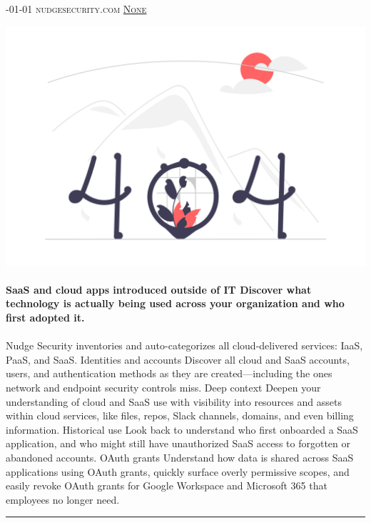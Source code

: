 \documentclass[10pt,a4paper]{article}
\begin{document}
\begin{multicols*}{2}

\noindent\begin{minipage}{\linewidth}
\subsection{}
\textsc{\footnotesize
{\scriptsize\faCalendar}-01-01 
{\scriptsize\faGlobe}\space 
nudgesecurity.com 
{\scriptsize\faComments}\space 
\href{}{None} 
}
\par\medskip\noindent
\href{https://www.nudgesecurity.com/free-shadow-it-inventory?utm\_medium=sponsored\&utm\_source=hacker\_nl\&utm\_content=newsletter\&utm\_campaign=shadow\_it\&utm\_term=230825}{
    \includegraphics[width=0.99\linewidth]{notfound.png}
}
\end{minipage}
\paragraph{}
\textbf{SaaS and cloud apps introduced outside of IT
Discover what technology is actually being used across your organization and who first adopted it.}
\paragraph{}
 Nudge Security inventories and auto-categorizes all cloud-delivered services: IaaS, PaaS, and SaaS.
Identities and accounts
Discover all cloud and SaaS accounts, users, and authentication methods as they are created—including the ones network and endpoint security controls miss.
Deep context
Deepen your understanding of cloud and SaaS use with visibility into resources and assets within cloud services, like files, repos, Slack channels, domains, and even billing information.
Historical use
Look back to understand who first onboarded a SaaS application, and who might still have unauthorized SaaS access to forgotten or abandoned accounts.
OAuth grants
Understand how data is shared across SaaS applications using OAuth grants, quickly surface overly permissive scopes, and easily revoke OAuth grants for Google Workspace and Microsoft 365 that employees no longer need.
\par\noindent\textcolor{red}{\rule{\linewidth}{0.2mm}}
\vfill
\null
\end{multicols*}
\end{document}
